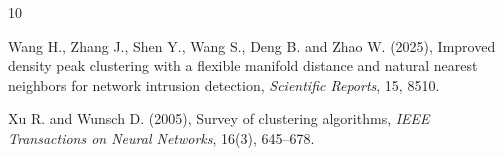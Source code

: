 \documentclass[10pt,twoside]{article}
\numberwithin{equation}{section}
\begin{document}
\begin{thebibliography}{10}
	


	Wang H., Zhang J., Shen Y., Wang S., Deng B. and Zhao W. (2025), Improved density peak clustering with a flexible manifold distance and natural nearest neighbors for network intrusion detection, {\it Scientific Reports}, 15, 8510.

	


	Xu R. and Wunsch D. (2005), Survey of clustering algorithms, {\it IEEE Transactions on Neural Networks}, 16(3), 645--678.

	

\end{thebibliography}
\end{document}
